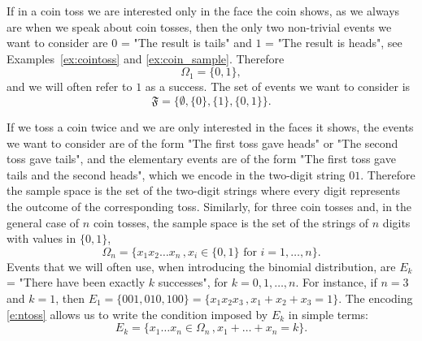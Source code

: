 \begin{model}
	\label{ex:one_coin}
	If in a coin toss we are interested only in the face the coin shows, as we always are when we speak about coin tosses, then the only two non-trivial events we want to consider are $0$ = "The result is tails" and $1$ = "The result is heads", see Examples~\ref{ex:cointoss} and \ref{ex:coin_sample}. Therefore 
	\begin{equation}
		\Omega_1 = \{0,1\}, 
	\end{equation}
	and we will often refer to $1$ as a success. The set of events we want to consider is 
	\begin{equation}
		\mathfrak F = \{\emptyset, \{0\}, \{1\}, \{0,1\}\}. 
	\end{equation}
\end{model}

\begin{model}
	\label{ex:n_coin}
	If we toss a coin twice and we are only interested in the faces it shows, the events we want to consider are of the form "The first toss gave heads" or "The second toss gave tails", and the elementary events are of the form "The first toss gave tails and the second heads", which we encode in the two-digit string $01$. Therefore the sample space is 
	the set of the two-digit strings where every digit represents the outcome of the corresponding toss. Similarly, for three coin tosses 
	and, in the general case of $n$ coin tosses, the sample space is the set of the strings of $n$ digits with values in $\{0,1\}$, 
	\begin{equation}
		\label{e:ntoss}
		\Omega_n = \{x_1 x_2 \ldots x_n \,, x_i \in \{0,1\} \text{ for $i = 1, \ldots, n$}\}. 
	\end{equation}
	Events that we will often use, when introducing the binomial distribution, are $E_k$ = "There have been exactly $k$ successes", for $k = 0, 1, \ldots, n$. For instance, if $n = 3$ and $k = 1$, then $E_1 = \{001, 010, 100\} = \{x_1 x_2 x_3 \,, x_1 + x_2 + x_3 = 1\}$. The encoding \eqref{e:ntoss} allows us to write the condition imposed by $E_k$ in simple terms: 
	\begin{equation}
		\label{e:ntoss_ksuccesses}
		E_k = \{x_1 \ldots x_n \in \Omega_n \,, x_1 + \ldots + x_n = k\}. 
	\end{equation}
\end{model}

